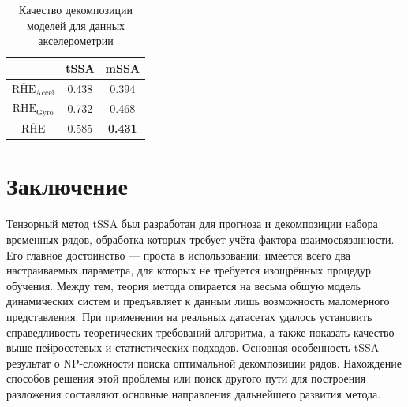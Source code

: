 			\def\arraystretch{1.2}
			\begin{table}[h!]
				\centering
				\caption{Качество декомпозиции моделей для данных акселерометрии}\label{tab:decomp_motion_results}
				\begin{tabular}{|c|c|c|}
					\hline
					& tSSA  & mSSA           \\ \hline
					$ \overline{\text{RHE}}_{\text{Accel}} $   & 0.438 & 0.394          \\ \hline
					$ \overline{\text{RHE}}_{\text{Gyro}} $ & 0.732 & 0.468          \\ \hline
					$ \overline{\text{RHE}} $         & 0.585 & \textbf{0.431} \\ \hline
				\end{tabular}
			\end{table}		
			
		\section{Заключение}
		
		Тензорный метод tSSA был разработан для прогноза и декомпозиции набора временных рядов, обработка которых требует учёта фактора взаимосвязанности. Его главное достоинство --- проста в использовании: имеется всего два настраиваемых параметра, для которых не требуется изощрённых процедур обучения. Между тем, теория метода опирается на весьма общую модель динамических систем и предъявляет к данным лишь возможность маломерного представления. При применении на реальных датасетах удалось установить справедливость теоретических требований алгоритма, а также показать качество выше нейросетевых и статистических подходов. Основная особенность tSSA --- результат о NP-сложности поиска оптимальной декомпозиции рядов. Нахождение способов решения этой проблемы или поиск другого пути для построения разложения составляют основные направления дальнейшего развития метода.
		
		\clearpage
		\printbibliography[heading=bibintoc]
	
